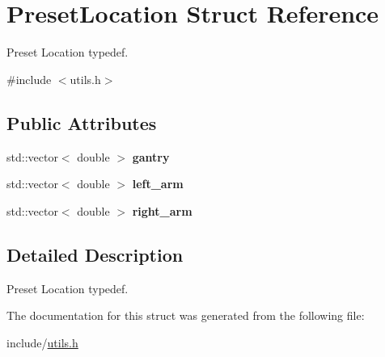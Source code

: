 \hypertarget{structPresetLocation}{}\section{Preset\+Location Struct Reference}
\label{structPresetLocation}


Preset Location typedef.  




{\ttfamily \#include $<$utils.\+h$>$}

\subsection*{Public Attributes}
\begin{DoxyCompactItemize}
\item 
\mbox{\label{structPresetLocation_a2e72ec837bd480d52c8588647216e51e}} 
std\+::vector$<$ double $>$ {\bfseries gantry}
\item 
\mbox{\label{structPresetLocation_af4ec647a46d50b9bdc9b73e9cc243efe}} 
std\+::vector$<$ double $>$ {\bfseries left\+\_\+arm}
\item 
\mbox{\label{structPresetLocation_a30f904f7e057787cf6c4be39407b571d}} 
std\+::vector$<$ double $>$ {\bfseries right\+\_\+arm}
\end{DoxyCompactItemize}


\subsection{Detailed Description}
Preset Location typedef. 

The documentation for this struct was generated from the following file\+:\begin{DoxyCompactItemize}
\item 
include/\hyperlink{utils_8h}{utils.\+h}\end{DoxyCompactItemize}
